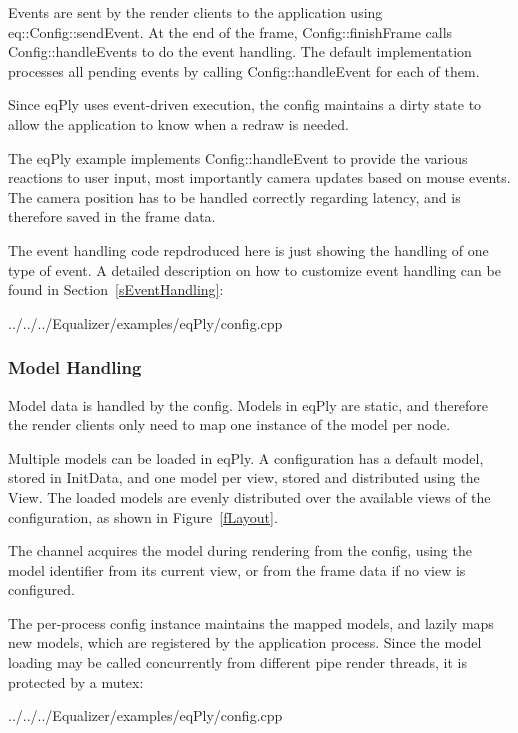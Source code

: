 \documentclass[10pt,a4]{scrartcl}
\newcommand{\fig}[1]{Figure~\ref{#1}}
\newcommand{\sref}[1]{Section~\ref{#1}}
\begin{document}
Events are sent by the render clients to the application using
\textsf{eq::Config::sendEvent}. At the end of the frame,
\textsf{Config::finishFrame} calls \textsf{Config::handleEvents} to do
the event handling. The default implementation processes all pending
events by calling \textsf{Config::handleEvent} for each of them.

Since \textsf{eqPly} uses event-driven execution, the config maintains a
dirty state to allow the application to know when a redraw is needed.

The \textsf{eqPly} example implements \textsf{Config::hand\-le\-Event}
to provide the various reactions to user input, most importantly camera
updates based on mouse events. The camera position has to be handled
correctly regarding latency, and is therefore saved in the frame data.

The event handling code repdroduced here is just showing the handling of one
type of event. A detailed description on how to customize event handling can be
found in \sref{sEventHandling}:

{\footnotesize
  {../../../Equalizer/examples/eqPly/config.cpp}}


\subsubsection{Model Handling}

Model data is handled by the config. Models in eqPly are static,
and therefore the render clients only need to map one instance of the
model per node.

Multiple models can be loaded in \textsf{eqPly}. A configuration has a default
model, stored in \textsf{InitData}, and one model per view, stored and
distributed using the \textsf{View}. The loaded models are evenly distributed
over the available views of the configuration, as shown in \fig{fLayout}.

The channel acquires the model during rendering from the config, using
the model identifier from its current view, or from the frame data if
no view is configured.

The per-process config instance maintains the mapped models, and lazily maps new
models, which are registered by the application process. Since the model loading
may be called concurrently from different pipe render threads, it is protected
by a \textsf{mutex}:

{\footnotesize
  {../../../Equalizer/examples/eqPly/config.cpp}}
\end{document}
